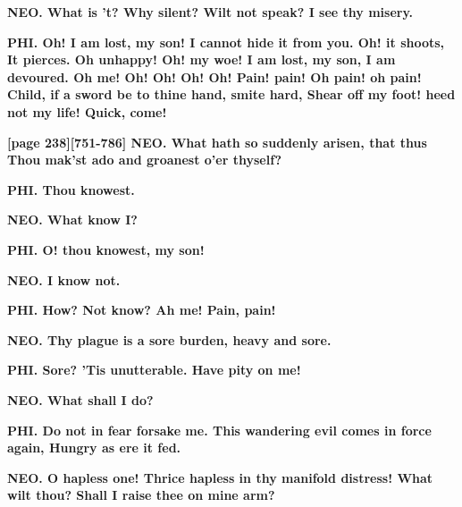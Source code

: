 \documentclass[11pt,letter]{book}
\begin{document}
\par \textbf{NEO. What is ’t? Why silent? Wilt not speak? I see thy misery.}
\par 

\par \textbf{PHI. Oh! I am lost, my son! I cannot hide it from you. Oh! it shoots, It pierces. Oh unhappy! Oh! my woe! I am lost, my son, I am devoured. Oh me! Oh! Oh! Oh! Oh! Pain! pain! Oh pain! oh pain! Child, if a sword be to thine hand, smite hard, Shear off my foot! heed not my life! Quick, come!}
\par 

\par \textbf{[page 238][751-786] NEO. What hath so suddenly arisen, that thus Thou mak’st ado and groanest o’er thyself?}
\par 

\par \textbf{PHI. Thou knowest.}
\par 

\par \textbf{NEO. What know I?}
\par 

\par \textbf{PHI. O! thou knowest, my son!}
\par 

\par \textbf{NEO. I know not.}
\par 

\par \textbf{PHI. How? Not know? Ah me! Pain, pain!}
\par 

\par \textbf{NEO. Thy plague is a sore burden, heavy and sore.}
\par 

\par \textbf{PHI. Sore? ’Tis unutterable. Have pity on me!}
\par 

\par \textbf{NEO. What shall I do?}
\par 

\par \textbf{PHI. Do not in fear forsake me. This wandering evil comes in force again, Hungry as ere it fed.}
\par 

\par \textbf{NEO. O hapless one! Thrice hapless in thy manifold distress! What wilt thou? Shall I raise thee on mine arm?}
\par 
\end{document}
